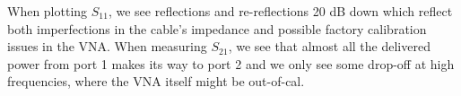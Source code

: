 \documentclass[11pt]{article}
\begin{document}
When plotting $S_{11}$, we see reflections and re-reflections 20 dB down which reflect both imperfections in the cable's impedance and possible factory calibration issues in the VNA. When measuring $S_{21}$, we see that almost all the delivered power from port 1 makes its way to port 2 and we only see some drop-off at high frequencies, where the VNA itself might be out-of-cal.

\section{}
\end{document}
